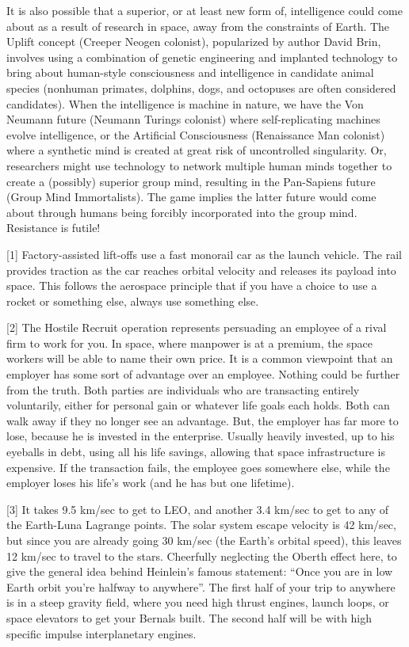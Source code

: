 \documentclass[a4paper]{book}
\begin{document}
It is also possible that a superior, or at least new form of, intelligence could come about as a result of research in space, away from the constraints of Earth. The Uplift concept (Creeper Neogen colonist), popularized by author David Brin, involves using a combination of genetic engineering and implanted technology to bring about human-style consciousness and intelligence in candidate animal species (nonhuman primates, dolphins, dogs, and octopuses are often considered candidates). When the intelligence is machine in nature, we have the Von Neumann future (Neumann Turings colonist) where self-replicating machines evolve intelligence, or the Artificial Consciousness (Renaissance Man colonist) where a synthetic mind is created at great risk of uncontrolled singularity. Or, researchers might use technology to network multiple human minds together to create a (possibly) superior group mind, resulting in the Pan-Sapiens future (Group Mind Immortalists). The game implies the latter future would come about through humans being forcibly incorporated into the group mind. Resistance is futile!



[1] Factory-assisted lift-offs use a fast monorail car as the launch vehicle. The rail provides traction as the car reaches orbital velocity and releases its payload into space. This follows the aerospace principle that if you have a choice to use a rocket or something else, always use something else.

[2] The Hostile Recruit operation represents persuading an employee of a rival firm to work for you. In space, where manpower is at a premium, the space workers will be able to name their own price. It is a common viewpoint that an employer has some sort of advantage over an employee. Nothing could be further from the truth. Both parties are individuals who are transacting entirely voluntarily, either for personal gain or whatever life goals each holds. Both can walk away if they no longer see an advantage. But, the employer has far more to lose, because he is invested in the enterprise. Usually heavily invested, up to his eyeballs in debt, using all his life savings, allowing that space infrastructure is expensive. If the transaction fails, the employee goes somewhere else, while the employer loses his life's work (and he has but one lifetime).
 
[3] It takes 9.5 km/sec to get to LEO, and another 3.4 km/sec to get to any of the Earth-Luna Lagrange points. The solar system escape velocity is 42 km/sec, but since you are already going 30 km/sec (the Earth’s orbital speed), this leaves 12 km/sec to travel to the stars. Cheerfully neglecting the Oberth effect here, to give the general idea behind Heinlein’s famous statement: “Once you are in low Earth orbit you’re halfway to anywhere”. The first half of your trip to anywhere is in a steep gravity field, where you need high thrust engines, launch loops, or space elevators to get your Bernals built. The second half will be with high specific impulse interplanetary engines.
 
\end{document}

